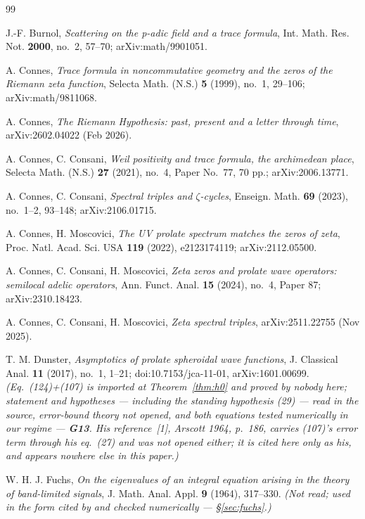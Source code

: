 \documentclass[11pt,a4paper]{article}
\theoremstyle{plain}
\theoremstyle{definition}
\theoremstyle{remark}
\begin{document}
\begin{thebibliography}{99}

J.-F. Burnol,
\emph{Scattering on the p-adic field and a trace formula},
Int. Math. Res. Not. \textbf{2000}, no.~2, 57--70; arXiv:math/9901051.

A. Connes,
\emph{Trace formula in noncommutative geometry and the zeros of the Riemann zeta
function},
Selecta Math. (N.S.) \textbf{5} (1999), no.~1, 29--106; arXiv:math/9811068.

A. Connes,
\emph{The Riemann Hypothesis: past, present and a letter through time},
arXiv:2602.04022 (Feb 2026).

A. Connes, C. Consani,
\emph{Weil positivity and trace formula, the archimedean place},
Selecta Math. (N.S.) \textbf{27} (2021), no.~4, Paper No.~77, 70 pp.;
arXiv:2006.13771.

A. Connes, C. Consani,
\emph{Spectral triples and $\zeta$-cycles},
Enseign. Math. \textbf{69} (2023), no.~1--2, 93--148; arXiv:2106.01715.

A. Connes, H. Moscovici,
\emph{The UV prolate spectrum matches the zeros of zeta},
Proc. Natl. Acad. Sci. USA \textbf{119} (2022), e2123174119; arXiv:2112.05500.

A. Connes, C. Consani, H. Moscovici,
\emph{Zeta zeros and prolate wave operators: semilocal adelic operators},
Ann. Funct. Anal. \textbf{15} (2024), no.~4, Paper 87; arXiv:2310.18423.

A. Connes, C. Consani, H. Moscovici,
\emph{Zeta spectral triples},
arXiv:2511.22755 (Nov 2025).

T. M. Dunster,
\emph{Asymptotics of prolate spheroidal wave functions},
J. Classical Anal. \textbf{11} (2017), no.~1, 1--21; doi:10.7153/jca-11-01,
arXiv:1601.00699.
\emph{(Eq.\ (124)+(107) is imported at Theorem~\ref{thm:h0} and proved by nobody
here; statement and hypotheses --- including the standing hypothesis (29) ---
read in the source, error-bound theory not opened, and both equations tested
numerically in our regime --- \textbf{G13}.  His reference~[1], Arscott 1964,
p.~186, carries (107)'s error term through his eq.~(27) and was not opened
either; it is cited here only as his, and appears nowhere else in this paper.)}

W. H. J. Fuchs,
\emph{On the eigenvalues of an integral equation arising in the theory of
band-limited signals},
J. Math. Anal. Appl. \textbf{9} (1964), 317--330.
\emph{(Not read; used in the form cited by \cite{Connes2026} and checked
numerically --- \S\ref{sec:fuchs}.)}


\end{thebibliography}
\end{document}
